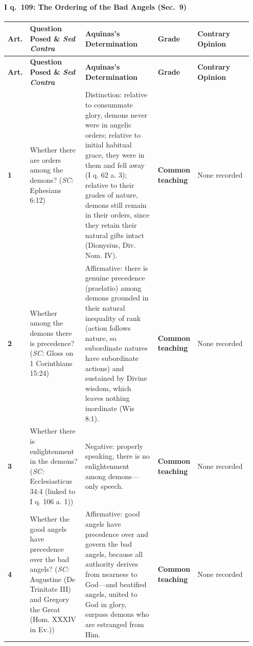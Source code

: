 \paragraph{I q.~109: The Ordering of the Bad Angels (Sec.~9)}
{\scriptsize
\setlength{\tabcolsep}{2.5pt}
\renewcommand{\arraystretch}{1.15}
\begin{longtable}{>{\raggedright\arraybackslash}p{0.05\linewidth}>{\raggedright\arraybackslash}p{0.23\linewidth}>{\raggedright\arraybackslash}p{0.31\linewidth}>{\raggedright\arraybackslash}p{0.12\linewidth}>{\raggedright\arraybackslash}p{0.24\linewidth}}
\toprule
\textbf{Art.} & \textbf{Question Posed \& \emph{Sed Contra}} & \textbf{Aquinas's Determination} & \textbf{Grade} & \textbf{Contrary Opinion} \\
\midrule
\endfirsthead
\toprule
\textbf{Art.} & \textbf{Question Posed \& \emph{Sed Contra}} & \textbf{Aquinas's Determination} & \textbf{Grade} & \textbf{Contrary Opinion} \\
\midrule
\endhead
\bottomrule
\endfoot
\textbf{1} & Whether there are orders among the demons? (\emph{SC:} Ephesians 6:12) & Distinction: relative to consummate glory, demons never were in angelic orders; relative to initial habitual grace, they were in them and fell away (I q. 62 a. 3); relative to their grades of nature, demons still remain in their orders, since they retain their natural gifts intact (Dionysius, Div. Nom. IV). & \textbf{Common teaching} & None recorded \\
\addlinespace[1.5pt]
\textbf{2} & Whether among the demons there is precedence? (\emph{SC:} Gloss on 1 Corinthians 15:24) & Affirmative: there is genuine precedence (praelatio) among demons grounded in their natural inequality of rank (action follows nature, so subordinate natures have subordinate actions) and sustained by Divine wisdom, which leaves nothing inordinate (Wis 8:1). & \textbf{Common teaching} & None recorded \\
\addlinespace[1.5pt]
\textbf{3} & Whether there is enlightenment in the demons? (\emph{SC:} Ecclesiasticus 34:4 (linked to I q. 106 a. 1)) & Negative: properly speaking, there is no enlightenment among demons---only speech. & \textbf{Common teaching} & None recorded \\
\addlinespace[1.5pt]
\textbf{4} & Whether the good angels have precedence over the bad angels? (\emph{SC:} Augustine (De Trinitate III) and Gregory the Great (Hom. XXXIV in Ev.)) & Affirmative: good angels have precedence over and govern the bad angels, because all authority derives from nearness to God---and beatified angels, united to God in glory, surpass demons who are estranged from Him. & \textbf{Common teaching} & None recorded \\
\end{longtable}
}

